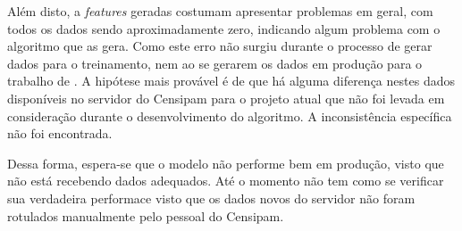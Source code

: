 Além disto, a \textit{features} geradas costumam apresentar problemas em geral, com todos os dados sendo aproximadamente zero, indicando algum problema com o algoritmo que as gera. Como este erro não surgiu durante o processo de gerar dados para o treinamento, nem ao se gerarem os dados em produção para o trabalho de \cite{BrunoScholess2023}. A hipótese mais provável é de que há alguma diferença nestes dados disponíveis no servidor do Censipam para o projeto atual que não foi levada em consideração durante o desenvolvimento do algoritmo. A inconsistência específica não foi encontrada.

Dessa forma, espera-se que o modelo não performe bem em produção, visto que não está recebendo dados adequados. Até o momento não tem como se verificar sua verdadeira performace visto que os dados novos do servidor não foram rotulados manualmente pelo pessoal do Censipam.












